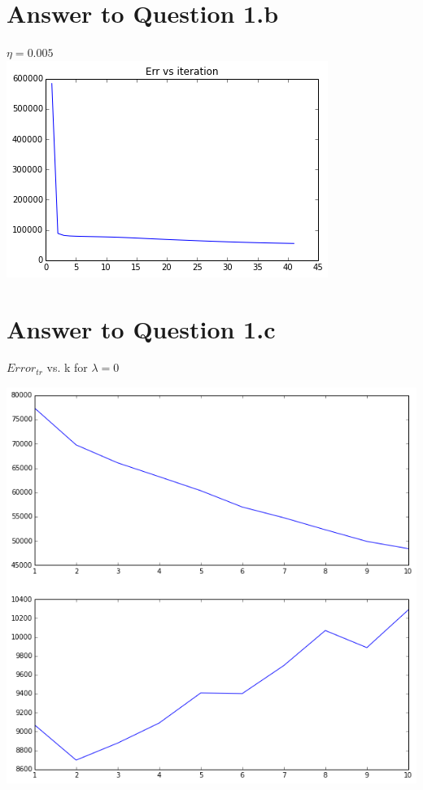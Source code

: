 \documentclass[11pt]{article}
\begin{document}
{\pagebreak[4]
\section*{Answer to Question 1.b}

$\eta = 0.005$\\
\includegraphics[scale=1]{q1errvsiter}


\pagebreak[4]
\section*{Answer to Question 1.c}
$Error_{tr}$ vs. k for $ \lambda = 0$\

\includegraphics[scale=0.8]{q1errtrverrtel0}\

}
\end{document}
